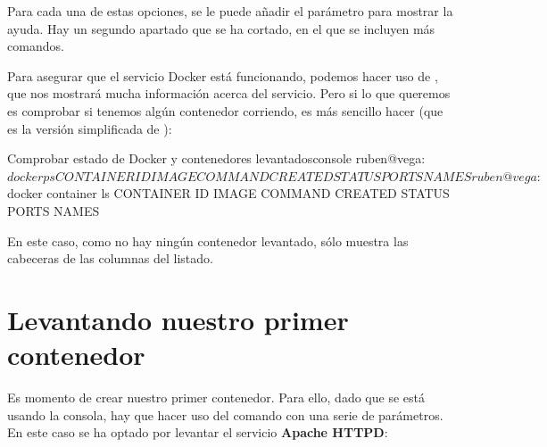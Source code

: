 
Para cada una de estas opciones, se le puede añadir el parámetro  para mostrar la ayuda. Hay un segundo apartado que se ha cortado, en el que se incluyen más comandos.

Para asegurar que el servicio Docker está funcionando, podemos hacer uso de , que nos mostrará mucha información acerca del servicio. Pero si lo que queremos es comprobar si tenemos algún contenedor corriendo, es más sencillo hacer  (que es la versión simplificada de  ):

\begin{mycode}{Comprobar estado de Docker y contenedores levantados}{console}{}
ruben@vega:~$ docker ps
CONTAINER ID   IMAGE     COMMAND   CREATED   STATUS    PORTS     NAMES

ruben@vega:~$ docker container ls
CONTAINER ID   IMAGE     COMMAND   CREATED   STATUS    PORTS     NAMES
\end{mycode}

En este caso, como no hay ningún contenedor levantado, sólo muestra las cabeceras de las columnas del listado.

\section{Levantando nuestro primer contenedor}
Es momento de crear nuestro primer contenedor. Para ello, dado que se está usando la consola, hay que hacer uso del comando  con una serie de parámetros. En este caso se ha optado por levantar el servicio \textbf{Apache HTTPD}:

